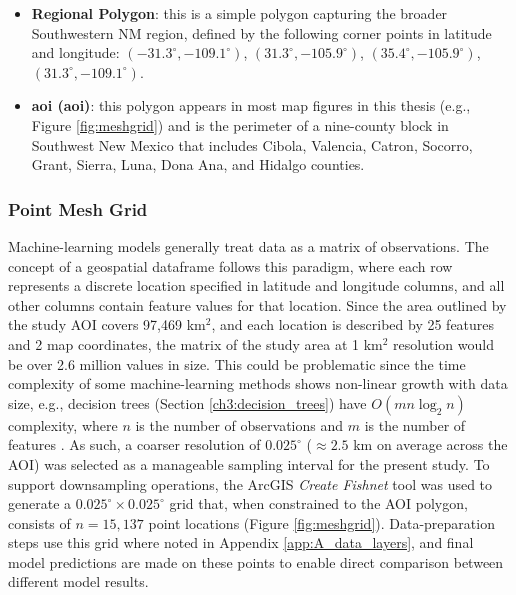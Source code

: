 \begin{itemize}
\item \textbf{Regional Polygon}: this is a simple polygon capturing the broader Southwestern NM region, defined by the following corner points in latitude and longitude: $(-31.3^\circ, -109.1^\circ)$, $(31.3^\circ, -105.9^\circ)$, $(35.4^\circ, -105.9^\circ)$, $(31.3^\circ, -109.1^\circ)$.

\item \textbf{\acrlong{aoi} (\acrshort{aoi})}: this polygon appears in most map figures in this thesis (e.g., Figure \ref{fig:meshgrid}) and is the perimeter of a nine-county block in Southwest New Mexico that includes Cibola, Valencia, Catron, Socorro, Grant, Sierra, Luna, Dona Ana, and Hidalgo counties.
\end{itemize}

\subsubsection{Point Mesh Grid}
\label{ch3:meshgrid}
Machine-learning models generally treat data as a matrix of observations. The concept of a geospatial dataframe follows this paradigm, where each row represents a discrete location specified in latitude and longitude columns, and all other columns contain feature values for that location. Since the area outlined by the study AOI covers 97,469 km$^2$, and each location is described by 25 features and 2 map coordinates, the matrix of the study area at 1 km$^2$ resolution would be over 2.6 million values in size. This could be problematic since the time complexity of some machine-learning methods shows non-linear growth with data size, e.g., decision trees (Section \ref{ch3:decision_trees}) have $O(mn\log_2n)$ complexity, where $n$ is the number of observations and $m$ is the number of features \citep{sani_computational_2018}. As such, a coarser resolution of $0.025^\circ$ ($\approx2.5$ km on average across the AOI) was selected as a manageable sampling interval for the present study. To support downsampling operations, the ArcGIS \textit{Create Fishnet} tool was used to generate a $0.025^\circ\times0.025^\circ$ grid that, when constrained to the AOI polygon, consists of $n=15,137$ point locations (Figure \ref{fig:meshgrid}). Data-preparation steps use this grid where noted in Appendix \ref{app:A_data_layers}, and final model predictions are made on these points to enable direct comparison between different model results. 

